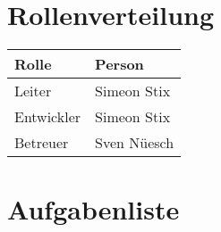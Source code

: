 \section{Rollenverteilung}
\label{sec:PlanungRollenverteilung}

	\begin{xltabular}{\linewidth}{|l|X|}
		\hline
		\textbf{Rolle} & \textbf{Person}
		\\\hline
		Leiter & Simeon Stix
		\\\hline
		Entwickler & Simeon Stix
		\\\hline
		Betreuer & Sven Nüesch
		\\\hline
	\end{xltabular}
	\label{tab:planungrollenverteilungtable}
\section{Aufgabenliste} 
\label{sec:PlanungAufgabenliste} 
